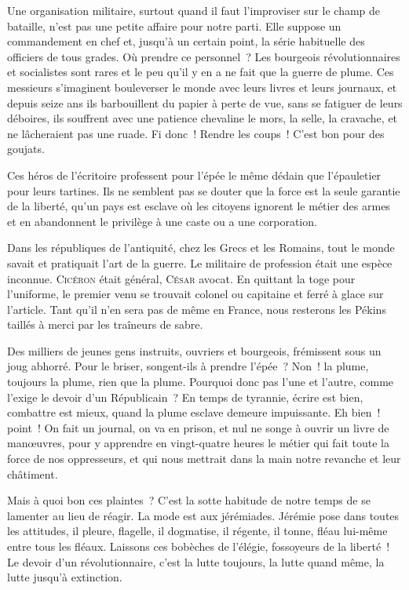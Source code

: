 \documentclass[french,twoside]{book} %
\begin{document}
Une organisation militaire, surtout quand il faut l’improviser sur le champ de bataille, n’est pas une petite affaire pour notre parti. Elle suppose un commandement en chef et, jusqu’à un certain point, la série habituelle des officiers de tous grades. Où prendre ce personnel ? Les bourgeois révolutionnaires et socialistes sont rares et le peu qu’il y en a ne fait que la guerre de plume. Ces messieurs s’imaginent bouleverser le monde avec leurs livres et leurs journaux, et depuis seize ans ils barbouillent du papier à perte de vue, sans se fatiguer de leurs déboires, ils souffrent avec une patience chevaline le mors, la selle, la cravache, et ne lâcheraient pas une ruade. Fi donc ! Rendre les coups ! C'est bon pour des goujats.\par
Ces héros de l’écritoire professent pour l’épée le même dédain que l’épauletier pour leurs tartines. Ils ne semblent pas se douter que la force est la seule garantie de la liberté, qu’un pays est esclave où les citoyens ignorent le métier des armes et en abandonnent le privilège à une caste ou a une corporation.\par
Dans les républiques de l’antiquité, chez les Grecs et les Romains, tout le monde savait et pratiquait l’art de la guerre. Le militaire de profession était une espèce inconnue. {\scshape Cicéron} était général, {\scshape César} avocat. En quittant la toge pour l’uniforme, le premier venu se trouvait colonel ou capitaine et ferré à glace sur l’article. Tant qu’il n’en sera pas de même en France, nous resterons les Pékins taillés à merci par les traîneurs de sabre.\par
Des milliers de jeunes gens instruits, ouvriers et bourgeois, frémissent sous un joug abhorré. Pour le briser, songent-ils à prendre l’épée ? Non ! la plume, toujours la plume, rien que la plume. Pourquoi donc pas l’une et l’autre, comme l’exige le devoir d’un Républicain ? En temps de tyrannie, écrire est bien, combattre est mieux, quand la plume esclave demeure impuissante. Eh bien ! point ! On fait un journal, on va en prison, et nul ne songe à ouvrir un livre de manœuvres, pour y apprendre en vingt-quatre heures le métier qui fait toute la force de nos oppresseurs, et qui nous mettrait dans la main notre revanche et leur châtiment.\par
Mais à quoi bon ces plaintes ? C'est la sotte habitude de notre temps de se lamenter au lieu de réagir. La mode est aux jérémiades. Jérémie pose dans toutes les attitudes, il pleure, flagelle, il dogmatise, il régente, il tonne, fléau lui-même entre tous les fléaux. Laissons ces bobèches de l’élégie, fossoyeurs de la liberté ! Le devoir d’un révolutionnaire, c’est la lutte toujours, la lutte quand même, la lutte jusqu’à extinction.\par
\end{document}
